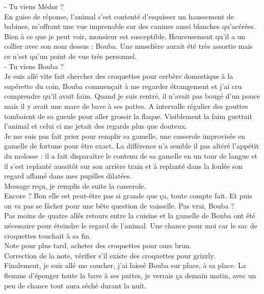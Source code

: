 - Tu viens Médor ?\\
En guise de réponse, l'animal s'est contenté d'esquisser un haussement de babines, m'offrant une vue imprenable sur des canines aussi blanches qu'acérées. Bien à ce que je peut voir, monsieur est susceptible. Heureusement qu'il a un collier avec son nom dessus : Bouba. Une muselière aurait été très assortie mais ce n'est qu'un point de vue très personnel.\\
- Tu viens Bouba ?\\

Je suis allé vite fait chercher des croquettes pour cerbère domestique à la supérette du coin, Bouba commençait à me regarder étrangement et j'ai cru comprendre qu'il avait faim. Quand je suis rentré, il n'avait pas bougé d'un pouce mais il y avait une mare de bave à ses pattes. A intervalle régulier des gouttes tombaient de sa gueule pour aller grossir la flaque. Visiblement la faim guettait l'animal et celui ci me jetait des regards plus que douteux. \\
Je me suis pas fait prier pour remplir sa gamelle, une casserole improvisée en gamelle de fortune pour être exact. La différence n'a semble il pas altéré l'appétit du molosse : il a fait disparaître le contenu de sa gamelle en un tour de langue et il s'est replanté aussitôt sur son arrière train et à replanté dans la foulée son regard affamé dans mes pupilles dilatées. \\
Message reçu, je remplis de suite la casserole. \\
Encore ? Bon elle est peut-être pas si grande que ça, toute compte fait. Et puis on va pas se fâcher pour une bête question de vaisselle. Pas vrai, Bouba ? \\

Pas moins de quatre allés retours entre la cuisine et la gamelle de Bouba ont été nécessaire pour éteindre le regard de l'animal. Une chance pour moi car le sac de croquettes touchait à sa fin. \\

Note pour plus tard, acheter des croquettes pour ours brun. \\
Correction de la note, vérifier s'il existe des croquettes pour grizzly. \\

Finalement, je suis allé me coucher, j'ai laissé Bouba sur place, à sa place. La flemme d'éponger toute la bave à ses pattes, je verrais ça demain matin, avec un peu de chance tout aura séché durant la nuit. \\

